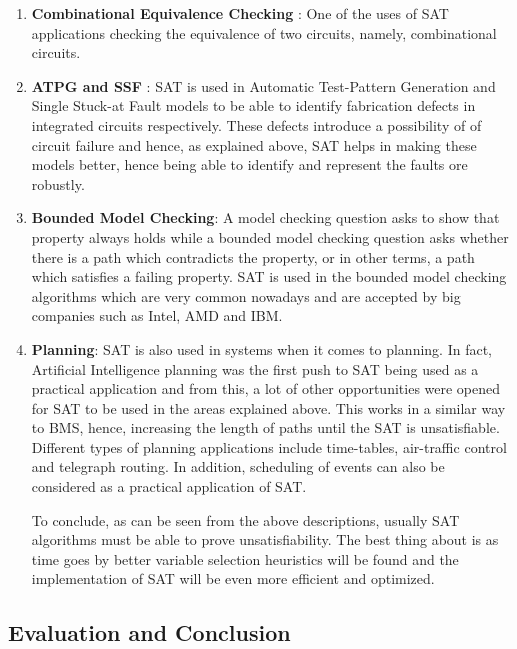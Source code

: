 \documentclass{article}
\begin{document}
\begin{enumerate}
\item \textbf{Combinational Equivalence Checking} : One of the uses of SAT applications checking the equivalence of two circuits, namely, combinational circuits\cite{pa3}. 
\item \textbf{ATPG and SSF} : SAT is used in Automatic Test-Pattern Generation and Single Stuck-at Fault models to be able to identify  fabrication defects in integrated circuits respectively\cite{pa3}. These defects introduce a possibility of of circuit failure and hence, as explained above, SAT helps in making these models better, hence being able to identify and represent the faults ore robustly.
\item \textbf{Bounded Model Checking}: A model checking question asks to show that property always holds while a bounded model checking question asks whether there is a path which contradicts the property, or in other terms, a path which satisfies a failing property. SAT is used in the bounded model checking algorithms which are very common nowadays and are accepted by big companies such as Intel, AMD and IBM\cite{pa1}.
\item \textbf{Planning}: SAT is also used in systems when it comes to planning. In fact, Artificial Intelligence planning was the first push to SAT being used as a practical application\cite{pa3} and from this, a lot of other opportunities were opened for SAT to be used in the areas explained above. This works in a similar way to BMS, hence, increasing the length of paths until the SAT is unsatisfiable. Different types of planning applications include time-tables, air-traffic control and telegraph routing\cite{pa1}. In addition, scheduling of events can also be considered as a practical application of SAT.

	To conclude, as can be seen from the above descriptions, usually SAT algorithms must be able to prove unsatisfiability. The best thing about is as time goes by better variable selection heuristics will be found and the implementation of SAT will be even more efficient and optimized. 

\end{enumerate}


		\subsection{Evaluation and Conclusion}
		
\end{document}
